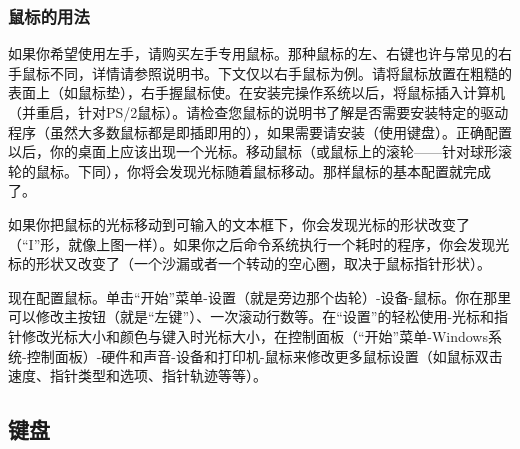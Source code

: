 \subsubsection{鼠标的用法}
如果你希望使用左手，请购买左手专用鼠标。那种鼠标的左、右键也许与常见的右手鼠标不同，详情请参照说明书。下文仅以右手鼠标为例。请将鼠标放置在粗糙的表面上（如鼠标垫），右手握鼠标使。在安装完操作系统以后，将鼠标插入计算机（并重启，针对PS/2鼠标）。请检查您鼠标的说明书了解是否需要安装特定的驱动程序（虽然大多数鼠标都是即插即用的），如果需要请安装（使用键盘）。正确配置以后，你的桌面上应该出现一个光标。移动鼠标（或鼠标上的滚轮——针对球形滚轮的鼠标。下同），你将会发现光标随着鼠标移动。那样鼠标的基本配置就完成了。\par
如果你把鼠标的光标移动到可输入的文本框下，你会发现光标的形状改变了（“I”形，就像上图一样）。如果你之后命令系统执行一个耗时的程序，你会发现光标的形状又改变了（一个沙漏或者一个转动的空心圈，取决于鼠标指针形状）。\par
现在配置鼠标。单击“开始”菜单-设置（就是旁边那个齿轮）-设备-鼠标。你在那里可以修改主按钮（就是“左键”）、一次滚动行数等。在“设置”的轻松使用-光标和指针修改光标大小和颜色与键入时光标大小，在控制面板（“开始”菜单-Windows系统-控制面板）-硬件和声音-设备和打印机-鼠标来修改更多鼠标设置（如鼠标双击速度、指针类型和选项、指针轨迹等等）。
\subsection{键盘}
